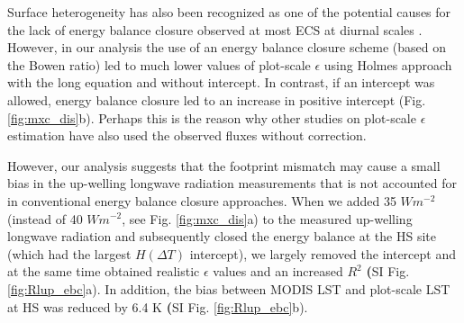 \documentclass[fleqn,10pt]{wlscirep}
\begin{document}
{{%
Surface heterogeneity has also been recognized as one of the potential causes for the lack of energy balance closure observed at most ECS at diurnal scales \cite{wilson2002energy, stoy2013data}. However, in our analysis the use of an energy balance closure scheme (based on the Bowen ratio) led to much lower values of plot-scale $\epsilon$ using Holmes approach with the long equation and without intercept. In contrast, if an intercept was allowed, energy balance closure led to an increase in positive intercept (Fig. \ref{fig:mxc_dis}b). 
Perhaps this is the reason why other studies on plot-scale $\epsilon$ estimation have also used the observed fluxes without correction\cite{holmes2009land,holmes2016cloud,maes2019potential}. 
 
However, our analysis suggests that the footprint mismatch may cause a small bias in the up-welling longwave radiation measurements that is not accounted for in conventional energy balance closure approaches. When we added 35 $Wm^{-2}$ (instead of 40 $Wm^{-2}$, see Fig. \ref{fig:mxc_dis}a) to the measured up-welling longwave radiation and subsequently closed the energy balance at the HS site (which had the largest $H(\Delta T)$ intercept), we largely removed the intercept and at the same time obtained realistic $\epsilon$ values and an increased $R^2$ \textbf(SI Fig. \ref{fig:Rlup_ebc}a). In addition, the bias between MODIS LST and plot-scale LST at HS was reduced by 6.4 K \textbf(SI Fig. \ref{fig:Rlup_ebc}b). %
 
}}
\end{document}
